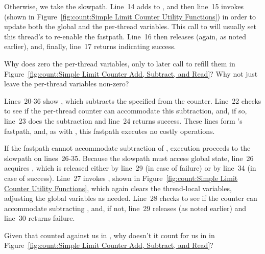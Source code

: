 Otherwise, we take the slowpath.
Line~14 adds  to , and then
line~15 invokes  (shown in
Figure~\ref{fig:count:Simple Limit Counter Utility Functions})
in order to update both the global and the per-thread variables.
This call to 
will usually set this thread's  to re-enable the fastpath.
Line~16 then releases
 (again, as noted earlier), and, finally,
line~17 returns indicating success.

\QuickQuiz{}
	Why does  zero the per-thread variables,
	only to later call  to refill them in
	Figure~\ref{fig:count:Simple Limit Counter Add, Subtract, and Read}?
	Why not just leave the per-thread variables non-zero?
 \QuickQuizEnd

Lines~20-36 show , which subtracts the specified
 from the counter.
Line~22 checks to see if the per-thread counter can accommodate
this subtraction, and, if so, line~23 does the subtraction and
line~24 returns success.
These lines form 's fastpath, and, as with
, this fastpath executes no costly operations.

If the fastpath cannot accommodate subtraction of ,
execution proceeds to the slowpath on lines~26-35.
Because the slowpath must access global state, line~26
acquires , which is released either by line~29
(in case of failure) or by line~34 (in case of success).
Line~27 invokes , shown in
Figure~\ref{fig:count:Simple Limit Counter Utility Functions},
which again clears the thread-local variables, adjusting the global variables
as needed.
Line~28 checks to see if the counter can accommodate subtracting
, and, if not, line~29 releases 
(as noted earlier) and line~30 returns failure.

\QuickQuiz{}
	Given that  counted against us in ,
	why doesn't it count for us in  in
	Figure~\ref{fig:count:Simple Limit Counter Add, Subtract, and Read}?
 \QuickQuizEnd

